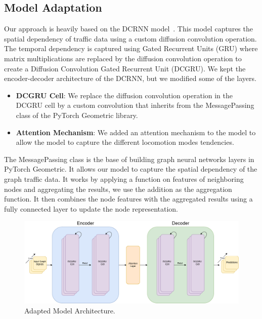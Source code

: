 \subsection{Model Adaptation}\label{subsec:model-adaptation}
Our approach is heavily based on the DCRNN model~\cite{DCRNN}.
This model captures the spatial dependency of traffic data using a custom diffusion convolution operation.
The temporal dependency is captured using Gated Recurrent Units (GRU) where matrix multiplications are replaced by
the diffusion convolution operation to create a Diffusion Convolution Gated Recurrent Unit (DCGRU).
We kept the encoder-decoder architecture of the DCRNN, but we modified some of the layers.

\begin{itemize}
    \item \textbf{DCGRU Cell}:
    We replace the diffusion convolution operation in the DCGRU cell by a custom convolution that inherits from the MessagePassing class of the PyTorch Geometric library.
    \item \textbf{Attention Mechanism}:
    We added an attention mechanism to the model to allow the model to capture the different locomotion modes tendencies.
\end{itemize}

The MessagePassing class is the base of building graph neural networks layers in PyTorch Geometric.
It allows our model to capture the spatial dependency of the graph traffic data.
It works by applying a function on features of neighboring nodes and aggregating the results, we use the addition as the aggregation function.
It then combines the node features with the aggregated results using a fully connected layer to update the node representation.

\begin{figure}[htbp]
    \centering
    \includegraphics[width=1\textwidth]{resources/model}
    \caption{
        Adapted Model Architecture.
    }
    \label{fig:model}
\end{figure}

